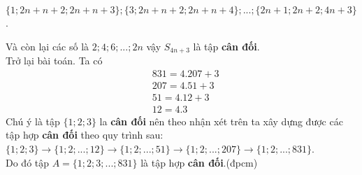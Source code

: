 \begin{ex}
{\begin{enumerate}
\begin{center}
   		$\{1;2n+n+2;2n+n+3\};\{3;2n+n+2;2n+n+4\};...;\{2n+1;2n+2;4n+3\}$.
   	\end{center}
   Và còn lại các số là $2;4;6;...;2n$ vậy $S_{4n+3}$ là tập \textbf{cân đối}.\\
   Trở lại bài toán. Ta có
   \begin{align*}
   	&831=4.207+3\\  
   	&207=4.51+3\\
   	&51=4.12+3\\
   	&12=4.3 	
   \end{align*}
   Chú ý là tập $\{1;2;3\}$ la \textbf{cân đối} nên theo nhận xét trên ta xây dựng được các  tập hợp \textbf{cân đối} theo quy trình sau:\\
   $\{1;2;3\}\rightarrow\{1;2;...;12\}\rightarrow\{1;2;...;51\}\rightarrow\{1;2;...;207\}\rightarrow\{1;2;...;831\}$.\\
   Do đó tập $A=\{1;2;3;...;831\}$ là tập hợp \textbf{cân đối}.(đpcm)
   	\end{enumerate}
} 
\end{ex}
